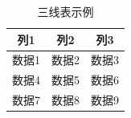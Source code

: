 \documentclass{article}
\begin{document}
\begin{table}[h!]
\centering
\begin{tabular}{ccc}
\toprule
列1 & 列2 & 列3 \\
\midrule
数据1 & 数据2 & 数据3 \\
数据4 & 数据5 & 数据6 \\
数据7 & 数据8 & 数据9 \\
\bottomrule
\end{tabular}
\caption{三线表示例}
\label{tab:example}
\end{table}
\end{document}
